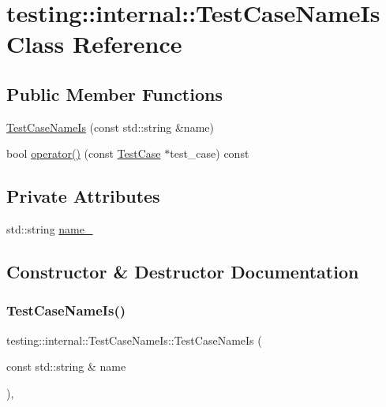 \hypertarget{classtesting_1_1internal_1_1_test_case_name_is}{}\section{testing\+::internal\+::Test\+Case\+Name\+Is Class Reference}
\label{classtesting_1_1internal_1_1_test_case_name_is}
\subsection*{Public Member Functions}
\begin{DoxyCompactItemize}
\item 
\mbox{\hyperlink{classtesting_1_1internal_1_1_test_case_name_is_a7c983707f4cfe7f36dbabc95da5113c4}{Test\+Case\+Name\+Is}} (const std\+::string \&name)
\item 
bool \mbox{\hyperlink{classtesting_1_1internal_1_1_test_case_name_is_aa96c4e9facbaa7043c8f0b34465d1eae}{operator()}} (const \mbox{\hyperlink{classtesting_1_1_test_case}{Test\+Case}} $\ast$test\+\_\+case) const
\end{DoxyCompactItemize}
\subsection*{Private Attributes}
\begin{DoxyCompactItemize}
\item 
std\+::string \mbox{\hyperlink{classtesting_1_1internal_1_1_test_case_name_is_a4e780c6613a81c4f14fc57e00c61474b}{name\+\_\+}}
\end{DoxyCompactItemize}


\subsection{Constructor \& Destructor Documentation}
\mbox{\label{classtesting_1_1internal_1_1_test_case_name_is_a7c983707f4cfe7f36dbabc95da5113c4}} 
\subsubsection{\texorpdfstring{TestCaseNameIs()}{TestCaseNameIs()}}
{\footnotesize\ttfamily testing\+::internal\+::\+Test\+Case\+Name\+Is\+::\+Test\+Case\+Name\+Is (\begin{DoxyParamCaption}\item[{const std\+::string \&}]{name }\end{DoxyParamCaption})\hspace{0.3cm}{\ttfamily [inline]}, {\ttfamily [explicit]}}



